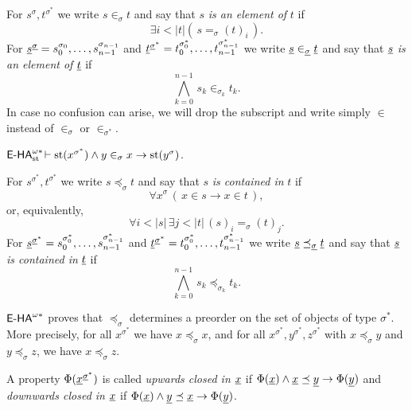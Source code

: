\begin{dfn}\label{def:element}
For $s^{\sigma},t^{\sigma^*}$ we write $s \in_{\sigma} t$ and say that $s$ \emph{is an element of} $t$ if
\[
         \exists i < |t| (\, s =_{\sigma} (t)_i \, ).
\]
For $\underline{s}^{\underline{\sigma}}=s_0^{\sigma_0},\ldots,s_{n-1}^{\sigma_{n-1}}$ and $\underline{t}^{\underline{\sigma}^*}=t_0^{\sigma^*_0},\ldots,t_{n-1}^{\sigma^*_{n-1}}$ we write $\underline{s} \in_{\underline{\sigma}} \underline{t}$ and say that $\underline{s}$ \emph{is an element of} $\underline{t}$ if
\[
        \bigwedge_{k=0}^{n-1} \, s_k \in_{\sigma_k} t_k.
\]
In case no confusion can arise, we will drop the subscript and write simply $\in$ instead of $\in_{\sigma}$ or $\in_{\sigma^*}$.
\end{dfn}

\begin{lemma} \label{elemstsetset}
${\textsf{\upshape E-HA}}^{\omega*}_{\operatorname{st}{}}\! \vdash \operatorname{st}(x^{\sigma^*}) \land y \in_\sigma x \to \operatorname{st}(y^\sigma)$.
\end{lemma}

\begin{dfn}\label{def:preorder}
For $s^{\sigma^*},t^{\sigma^*}$ we write $s \preceq_{\sigma} t$ and say that $s$ \emph{is contained in} $t$ if
\[
         \forall x^\sigma \, ( \, x \in s \to x \in t \, ),
\]
or, equivalently,
\[ \forall i < |s| \, \exists j < |t| \, (s)_i =_{\sigma} (t)_j. \]
For $\underline{s}^{\underline{\sigma}^*}=s_0^{\sigma^*_0},\ldots,s_{n-1}^{\sigma^*_{n-1}}$ and $\underline{t}^{\underline{\sigma}^*}=t_0^{\sigma^*_0},\ldots,t_{n-1}^{\sigma^*_{n-1}}$ we write $\underline{s} \preceq_{\underline{\sigma}} \underline{t}$ and say that $\underline{s}$ \emph{is contained in} $\underline{t}$ if
\[
        \bigwedge_{k=0}^{n-1} \, s_k \preceq_{\sigma_k} t_k.
\]
\end{dfn}

\begin{lemma} ${\textsf{\upshape E-HA}}^{\omega*}$ proves that $\preceq_{\sigma}$ determines a preorder on the set of objects of type $\sigma^*$. More precisely, for all $x^{\sigma^*}$ we have $x \preceq_{\sigma} x$, and for all $x^{\sigma^*},y^{\sigma^*},z^{\sigma^*}$ with $x \preceq_{\sigma} y$ and $y \preceq_{\sigma} z$, we have $x \preceq_{\sigma} z$.
\end{lemma}

\begin{dfn}
A property $\Phi(\underline{x}^{\underline{\sigma}^*})$ is called \emph{upwards closed in $\underline{x}$} if
$\Phi(\underline{x})\land \underline{x} \preceq \underline{y} \to \Phi(\underline{y})$
and \emph{downwards closed in $\underline{x}$} if
$\Phi(\underline{x})\land \underline{y} \preceq \underline{x} \to \Phi(\underline{y})$.
\end{dfn}

